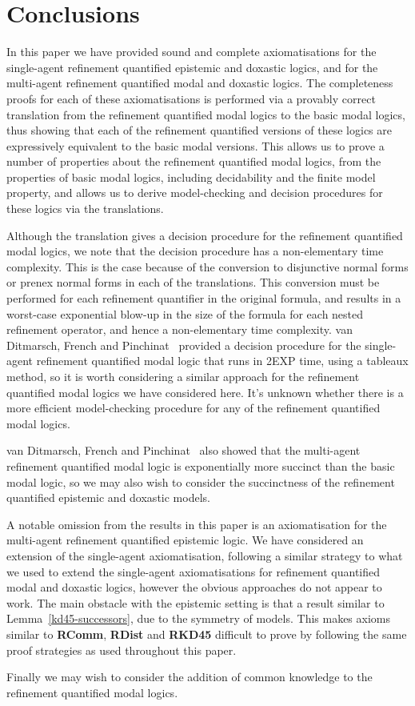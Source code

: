 \chapter{Conclusions}

In this paper we have provided sound and complete axiomatisations for the
single-agent refinement quantified epistemic and doxastic logics, and for the
multi-agent refinement quantified modal and doxastic logics. The completeness
proofs for each of these axiomatisations is performed via a provably correct
translation from the refinement quantified modal logics to the basic modal
logics, thus showing that each of the refinement quantified versions of these
logics are expressively equivalent to the basic modal versions. This allows us
to prove a number of properties about the refinement quantified modal logics,
from the properties of basic modal logics, including decidability and the finite
model property, and allows us to derive model-checking and decision procedures
for these logics via the translations.

Although the translation gives a decision procedure for the refinement
quantified modal logics, we note that the decision procedure has a
non-elementary time complexity. This is the case because of the conversion to
disjunctive normal forms or prenex normal forms in each of the translations.
This conversion must be performed for each refinement quantifier in the original
formula, and results in a worst-case exponential blow-up in the size of the
formula for each nested refinement operator, and hence a non-elementary time
complexity. van Ditmarsch, French and Pinchinat~\cite{french2010future} provided
a decision procedure for the single-agent refinement quantified modal logic that
runs in 2EXP time, using a tableaux method, so it is worth considering a similar
approach for the refinement quantified modal logics we have considered here.
It's unknown whether there is a more efficient model-checking procedure for any
of the refinement quantified modal logics.

van Ditmarsch, French and Pinchinat~\cite{french2010future} also showed
that the multi-agent refinement quantified modal logic is exponentially more
succinct than the basic modal logic, so we may also wish to consider the
succinctness of the refinement quantified epistemic and doxastic models.

A notable omission from the results in this paper is an axiomatisation for the
multi-agent refinement quantified epistemic logic. We have considered an
extension of the single-agent axiomatisation, following a similar strategy to
what we used to extend the single-agent axiomatisations for refinement
quantified modal and doxastic logics, however the obvious approaches do not
appear to work. The main obstacle with the epistemic setting is that a result
similar to Lemma~\ref{kd45-successors}, due to the symmetry of \classS{} models.
This makes axioms similar to {\bf RComm}, {\bf RDist} and {\bf RKD45} difficult
to prove by following the same proof strategies as used throughout this paper.

Finally we may wish to consider the addition of common knowledge to the
refinement quantified modal logics.


